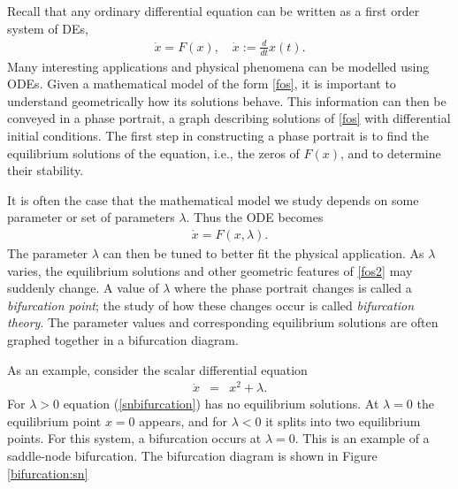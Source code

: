 \label{lab:Bifurcations}

Recall that any ordinary differential equation can be written as a first order system of DEs, 
\begin{align}
\dot{x} = F(x), \quad \dot{x} := \frac{d}{dt}x(t).\label{fos}
\end{align}
Many interesting applications and physical phenomena can be modelled using ODEs.
Given a mathematical model of the form \eqref{fos}, it is important to understand geometrically how its solutions behave.
This information can then be conveyed in a phase portrait, a graph describing solutions of \eqref{fos} with differential initial conditions.
The first step in constructing a phase portrait is to find the equilibrium solutions of the equation, i.e., the zeros of $F(x)$, and to determine their stability.

It is often the case that the mathematical model we study depends on some parameter or set of parameters $\lambda$.
Thus the ODE becomes 
\begin{align}
\dot{x} = F(x,\lambda).\label{fos2}
\end{align}
The parameter $\lambda$ can then be tuned to better fit the physical application.
As $\lambda$ varies, the equilibrium solutions and other geometric features of \eqref{fos2} may suddenly change.
A value of $\lambda$ where the phase portrait changes is called a \emph{bifurcation point}; the study of how these changes occur is called \emph{bifurcation theory}.
The parameter values and corresponding equilibrium solutions are often graphed together in a bifurcation diagram. 

As an example, consider the scalar differential equation 
\begin{eqnarray}
\dot{x} &=& x^2 + \lambda. \label{snbifurcation}
\end{eqnarray}
For $\lambda > 0$ equation (\ref{snbifurcation}) has no equilibrium solutions.
At $\lambda = 0$ the equilibrium point $x=0$ appears, and for $\lambda < 0$ it splits into two equilibrium points.
For this system, a bifurcation occurs at $\lambda = 0$.
This is an example of a saddle-node bifurcation.
The bifurcation diagram is shown in Figure \ref{bifurcation:sn}

